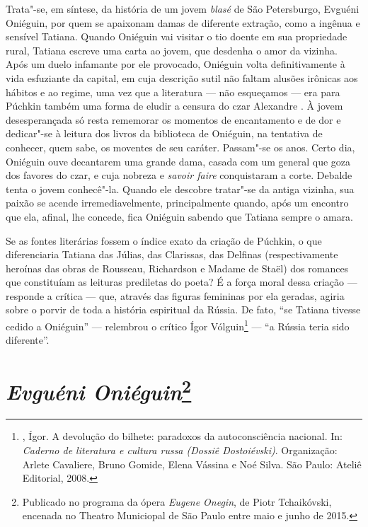 Trata"-se, em síntese, da história de um jovem \emph{blasé} de São Petersburgo, Evguéni Oniéguin,
por quem se apaixonam damas de diferente extração, como a ingênua e sensível Tatiana. Quando Oniéguin vai visitar o tio doente em sua propriedade rural, Tatiana escreve uma carta ao jovem, que desdenha o amor da vizinha. Após um duelo infamante por ele
provocado, Oniéguin volta definitivamente à vida esfuziante da capital,
em cuja descrição sutil não faltam alusões irônicas aos hábitos e ao
regime, uma vez que a literatura --- não esqueçamos --- era para Púchkin
também uma forma de eludir a censura do czar Alexandre . À jovem
desesperançada só resta rememorar os momentos de encantamento e de dor e
dedicar"-se à leitura dos livros da biblioteca de Oniéguin, na tentativa
de conhecer, quem sabe, os moventes de seu caráter. Passam"-se os anos.
Certo dia, Oniéguin ouve decantarem uma grande dama, casada com um general
que goza dos favores do czar, e cuja nobreza e \emph{savoir faire} conquistaram
a corte. Debalde tenta o jovem conhecê"-la. Quando ele descobre tratar"-se
da antiga vizinha, sua paixão se acende irremediavelmente, principalmente
quando, após um encontro que ela, afinal, lhe concede, fica Oniéguin
sabendo que Tatiana sempre o amara.

Se as fontes literárias fossem o índice exato da criação de Púchkin, o
que diferenciaria Tatiana das Júlias, das Clarissas, das Delfinas
(respectivamente heroínas das obras de Rousseau, Richardson e Madame de
Staël) dos romances que constituíam as leituras prediletas do poeta? É a força
moral dessa criação --- responde a crítica --- que, através das figuras
femininas por ela geradas, agiria sobre o porvir de toda a história
espiritual da Rússia. De fato, ``se Tatiana tivesse cedido a Oniéguin'' ---
relembrou o crítico Ígor Vólguin\footnote{, Ígor. A devolução do bilhete: paradoxos da
autoconsciência nacional. In: \emph{Caderno de literatura e cultura russa (Dossiê Dostoiévski)}. Organização: Arlete Cavaliere, Bruno Gomide, Elena Vássina e Noé Silva. São Paulo: Ateliê Editorial, 2008.} --- ``a Rússia teria sido diferente''.

\chapter{\emph{Evguéni Oniéguin}\footnote{Publicado no programa da ópera \emph{Eugene Onegin}, de Piotr Tchaikóvski, encenada no Theatro Municiopal de São Paulo entre maio e junho de 2015.}}
\label{onieguin}

